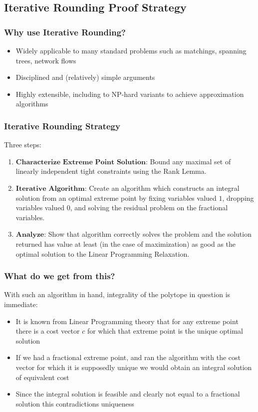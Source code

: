 \documentclass{beamer}
\begin{document}
\subsection{Iterative Rounding Proof Strategy}
\begin{frame}
\frametitle{Why use Iterative Rounding?}
\begin{itemize}
\item Widely applicable to many standard problems such as matchings, spanning trees, network flows
\item Disciplined and (relatively) simple arguments
\item Highly extensible, including to NP-hard variants to achieve approximation algorithms
\end{itemize}
\end{frame}

\begin{frame}
\frametitle{Iterative Rounding Strategy}
Three steps:
\begin{enumerate}
\item<1-> $\textbf{Characterize Extreme Point Solution:}$ Bound any maximal set of linearly independent tight constraints using the Rank Lemma.
\item<2-> $\textbf{Iterative Algorithm:}$ Create an algorithm which constructs an integral solution from an optimal extreme point by fixing variables valued $1$, dropping variables valued $0$, and solving the residual problem on the fractional variables.
\item<3-> $\textbf{Analyze:}$ Show that algorithm correctly solves the problem and the solution returned has value at least (in the case of maximization) as good as the optimal solution to the Linear Programming Relaxation. 
\end{enumerate}
\end{frame}

\begin{frame}
\frametitle{What do we get from this?}
With such an algorithm in hand, integrality of the polytope in question is immediate:
\begin{itemize}
\item  It is known from Linear Programming theory that for any extreme point there is a cost vector $c$ for which that extreme point is the unique optimal solution
\item If we had a fractional extreme point, and ran the algorithm with the cost vector for which it is supposedly unique we would obtain an integral solution of equivalent cost
\item Since the integral solution is feasible and clearly not equal to a fractional solution this contradictions uniqueness
\end{itemize}
\end{frame}
\end{document}
